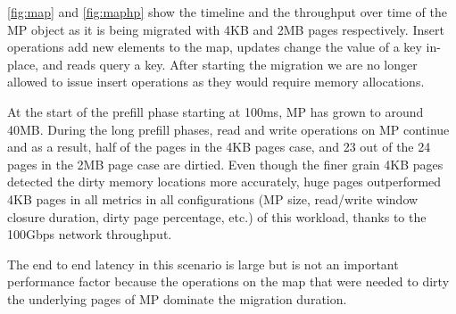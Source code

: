 \autoref{fig:map} and \autoref{fig:maphp} show the timeline and the throughput
over time of the MP object as it is being migrated with 4KB and 2MB pages
respectively. Insert operations add new elements to the map, updates change
the value of a key in-place, and reads query a key. After starting the migration
we are no longer allowed to issue insert operations as they would require
memory allocations.

At the start of the prefill phase starting at 100ms, MP has grown to around 40MB.
During the long prefill phases, read and write operations on MP continue and as
a result, half of the pages in the 4KB pages case, and 23 out of the 24 pages in the
2MB page case are dirtied. Even though the finer grain 4KB pages detected the
dirty memory locations more accurately, huge pages outperformed 4KB pages in all
metrics in all configurations (MP size, read/write window closure duration,
dirty page percentage, etc.) of this workload, thanks to the 100Gbps network
throughput.

The end to end latency in this scenario is large but is not an important
performance factor because the operations
on the map that were needed to dirty the underlying pages of MP dominate
the migration duration.



